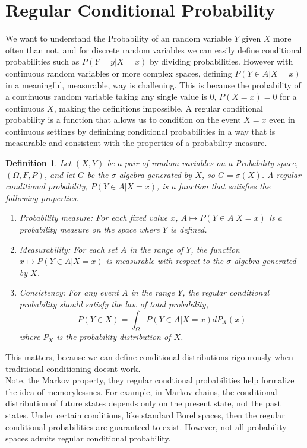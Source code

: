 \documentclass{article}
\newtheorem{definition}{Definition}
\begin{document}
\section{Regular Conditional Probability}
We want to understand the Probability of an random variable $Y$ given $X$ more often than not, and for discrete random variables we can easily define conditional probabilities such as $P(Y=y|X=x)$ by dividing probabilities. However with continuous random variables or more complex spaces, defining $P(Y\in A|X=x)$ in a meaningful, measurable, way is challening. This is because the probability of a continuous random variable taking any single value is 0, $P(X=x)=0$ for a continuous $X$, making the definitions impossible.
A regular conditional probability is a function that allows us to condition on the event $X=x$ even in continuous settings by definining conditional probabilities in a way that is measurable and consistent with the properties of a probability measure.

\begin{definition}
    Let $(X,Y)$ be a pair of random variables on a Probability space, $(\Omega, F, P)$, and let $G$ be the $\sigma$-algebra generated by $X$, so $G=\sigma(X)$. A regular conditional probability, $P(Y\in A|X=x)$, is a function that satisfies the following properties. 
    \begin{enumerate}
        \item Probability measure: For each fixed value $x$, $A \mapsto P(Y\in A|X=x)$ is a probability measure on the space where $Y$ is defined. 
        \item Measurability: For each set $A$ in the range of $Y$, the function $x\mapsto P(Y\in A| X=x)$ is measurable with respect to the $\sigma$-algebra generated by $X$. 
        \item Consistency: For any event $A$ in the range $Y$, the regular conditional probability should satisfy the law of total probability, 
        $$P(Y\in X) = \int_\Omega P(Y\in A| X=x)d P_X(x)$$
        where $P_X$ is the probability distribution of $X$.  
    \end{enumerate}
\end{definition}
This matters, because we can define conditional distributions rigourously when traditional conditioning doesnt work. \\
Note, the Markov property, they regular condtional probabilities help formalize the idea of memorylessnes. For example, in Markov chains, the conditional distribution of future states depends only on the present state, not the past states.
Under certain conditions, like standard Borel spaces, then the regular conditional probabilities are guaranteed to exist. However, not all probability spaces admits regular conditional probability. 
\end{document}
